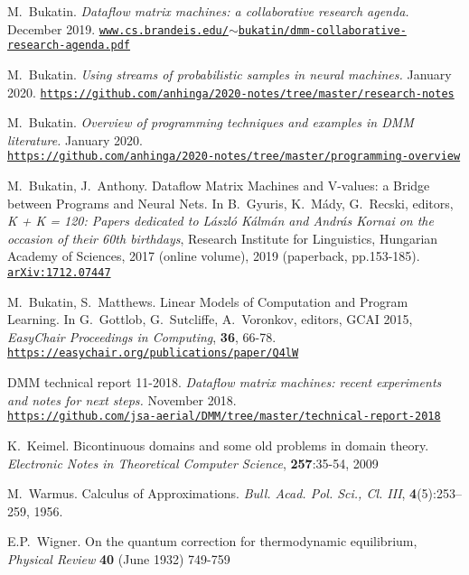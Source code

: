 \documentclass{article}
\begin{document}
\begin{thebibliography}{1}

 M.~Bukatin.
{\em Dataflow matrix machines: a collaborative research agenda.} December 2019.
\href{https://www.cs.brandeis.edu/~bukatin/dmm-collaborative-research-agenda.pdf}{\tt\footnotesize www.cs.brandeis.edu/$\sim$bukatin/dmm-collaborative-research-agenda.pdf}

 M.~Bukatin.
{\em Using streams of probabilistic samples in neural machines.} January 2020.
\href{https://github.com/anhinga/2020-notes/tree/master/research-notes}{\tt\footnotesize https://github.com/anhinga/2020-notes/tree/master/research-notes}

 M.~Bukatin.
{\em Overview of programming techniques and examples in DMM literature.} January 2020.\\
\href{https://github.com/anhinga/2020-notes/tree/master/programming-overview}
{\tt\footnotesize https://github.com/anhinga/2020-notes/tree/master/programming-overview}

 M.~Bukatin, J.~Anthony.
Dataflow Matrix Machines and V-values: a Bridge between Programs and Neural Nets. 
In B.~Gyuris, K.~M\'ady, G.~Recski, editors, {\em K + K = 120: Papers dedicated to L\'aszl\'o K\'alm\'an and Andr\'as Kornai on the occasion of their 60th birthdays}, Research Institute for Linguistics, Hungarian Academy of Sciences, 2017 (online volume), 2019 (paperback, pp.153-185).
\href{https://arxiv.org/abs/1712.07447}{\tt\footnotesize arXiv:1712.07447}

 M.~Bukatin, S.~Matthews.
Linear Models of Computation and Program Learning. In G.~Gottlob, G.~Sutcliffe, A.~Voronkov, editors,
GCAI 2015, {\em EasyChair Proceedings in Computing}, {\bf 36}, 66-78.
\href{https://easychair.org/publications/paper/Q4lW}{\tt\footnotesize https://easychair.org/publications/paper/Q4lW}

 DMM technical report 11-2018.
{\em Dataflow matrix machines: recent experiments and notes for next steps.} November 2018.\\
\href{https://github.com/jsa-aerial/DMM/tree/master/technical-report-2018}
{\tt\footnotesize https://github.com/jsa-aerial/DMM/tree/master/technical-report-2018}



K.~Keimel.  Bicontinuous domains and some old problems in domain theory. {\em Electronic Notes in Theoretical Computer Science}, {\bf 257}:35-54, 2009

M.~Warmus. Calculus of Approximations. {\em Bull. Acad. Pol. Sci., Cl. III}, {\bf 4}(5):253--259, 1956.

E.P.~Wigner. On the quantum correction for thermodynamic equilibrium, {\em Physical Review} {\bf 40} (June 1932) 749-759

\end{thebibliography}
\end{document}

